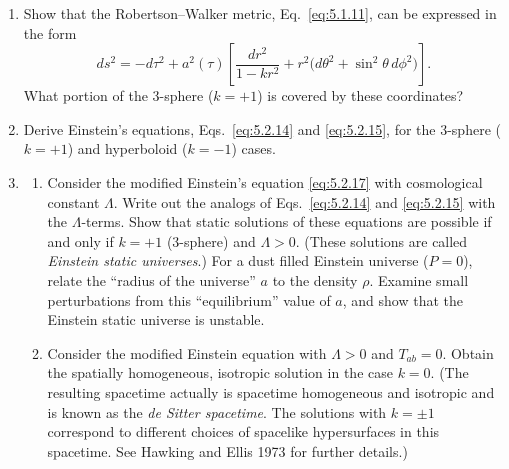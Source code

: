 
\chapterproblems

\begin{enumerate}[label=\arabic*.,leftmargin=*]
\item Show that the Robertson--Walker metric, Eq.~\eqref{eq:5.1.11}, can be
expressed in the form
\begin{equation*}
  ds^2=-d\tau^2+a^2(\tau)\left[
    \frac{dr^2}{1-kr^2}+r^2\bigl(d\theta^2+\sin^2\theta\,d\phi^2\bigr)
  \right].
\end{equation*}
What portion of the 3-sphere (\(k=+1\)) is covered by these coordinates?

\item Derive Einstein's equations, Eqs.~\eqref{eq:5.2.14} and \eqref{eq:5.2.15},
for the 3-sphere (\(k=+1\)) and hyperboloid (\(k=-1\)) cases.

\item
\begin{enumerate}[label=\alph*),leftmargin=2.5em]
\item Consider the modified Einstein's equation \eqref{eq:5.2.17} with cosmological
constant \(\Lambda\). Write out the analogs of Eqs.~\eqref{eq:5.2.14} and
\eqref{eq:5.2.15} with the \(\Lambda\)-terms. Show that static solutions of these
equations are possible if and only if \(k=+1\) (3-sphere) and \(\Lambda>0\).
(These solutions are called \emph{Einstein static universes}.) For a dust filled
Einstein universe (\(P=0\)), relate the ``radius of the universe'' \(a\) to the density
\(\rho\). Examine small perturbations from this ``equilibrium'' value of \(a\), and
show that the Einstein static universe is unstable.

\par\medskip

\item Consider the modified Einstein equation with \(\Lambda>0\) and \(T_{ab}=0\).
Obtain the spatially homogeneous, isotropic solution in the case \(k=0\). (The
resulting spacetime actually is spacetime homogeneous and isotropic and is known as
the \emph{de Sitter spacetime}. The solutions with \(k=\pm1\) correspond to different
choices of spacelike hypersurfaces in this spacetime. See Hawking and Ellis 1973 for
further details.)
\end{enumerate}


\end{enumerate}
